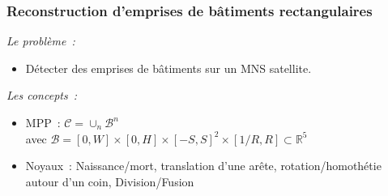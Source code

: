 \documentclass{beamer}
\begin{document}
\begin{frame}
\frametitle{Reconstruction d'emprises de bâtiments rectangulaires}
\emph{Le probl\`eme~:} 
\begin{itemize}
\item Détecter des emprises de bâtiments sur un MNS satellite.
\end{itemize}
\emph{Les concepts~:}
\begin{itemize}
\item MPP~:  $\mathcal{C} = \cup_{n}\mathcal{B}^n$\\
avec $\mathcal{B}=[0,W]\times[0,H]\times[-S,S]^2\times[1/R,R] \subset  \mathds{R}^{5}$
\item Noyaux~: Naissance/mort, translation d'une arête, rotation/homothétie autour d'un coin, Division/Fusion
\end{itemize}


\end{frame}
\end{document}
